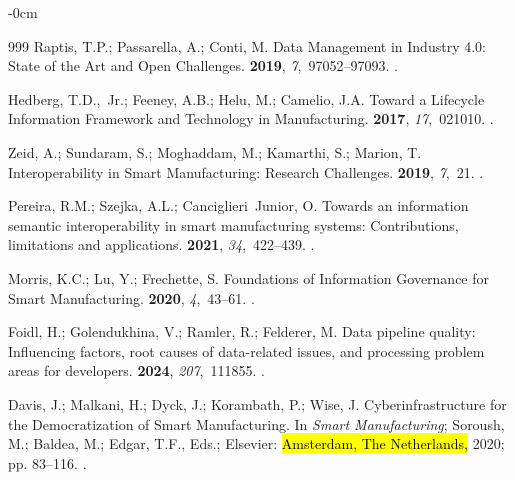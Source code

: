 \documentclass[systems,article,accept,pdftex,moreauthors]{Definitions/mdpi}
\begin{document}
\begin{adjustwidth}{-\extralength}{0cm}
\begin{thebibliography}{999}
Raptis, T.P.; Passarella, A.; Conti, M.
\newblock Data Management in Industry 4.0: State of the Art and Open
  Challenges.
 {\bf 2019}, {\em 7},~97052--97093.
.

Hedberg, T.D.,~Jr.; Feeney, A.B.; Helu, M.; Camelio, J.A.
\newblock Toward a Lifecycle Information Framework and Technology in
  Manufacturing.
 {\bf 2017}, {\em 17},~021010.
.

Zeid, A.; Sundaram, S.; Moghaddam, M.; Kamarthi, S.; Marion, T.
\newblock Interoperability in Smart Manufacturing: Research Challenges.
 {\bf 2019}, {\em 7},~21.
.

Pereira, R.M.; Szejka, A.L.; Canciglieri~Junior, O.
\newblock Towards an information semantic interoperability in smart
  manufacturing systems: Contributions, limitations and applications.
 {\bf 2021}, {\em 34},~422--439.
.

Morris, K.C.; Lu, Y.; Frechette, S.
\newblock Foundations of Information Governance for Smart Manufacturing.
 {\bf 2020}, {\em 4},~43--61.
.

Foidl, H.; Golendukhina, V.; Ramler, R.; Felderer, M.
\newblock Data pipeline quality: Influencing factors, root causes of
  data-related issues, and processing problem areas for developers.
 {\bf 2024}, {\em 207},~111855.
.

Davis, J.; Malkani, H.; Dyck, J.; Korambath, P.; Wise, J.
\newblock Cyberinfrastructure for the Democratization of Smart Manufacturing.
  In {\em Smart Manufacturing}; Soroush, M.; Baldea, M.; Edgar, T.F., Eds.;
  Elsevier:  \hl{Amsterdam, The Netherlands,} %
2020; pp. 83--116.
.


\end{thebibliography}
\end{adjustwidth}
\end{document}
